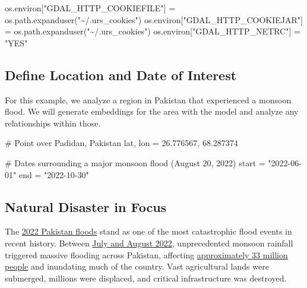 \documentclass[
  letterpaper,
  DIV=11,
  numbers=noendperiod]{scrreprt}
\newenvironment{Shaded}{\begin{snugshade}}{\end{snugshade}}
\newcommand{\CommentTok}[1]{\textcolor[rgb]{0.37,0.37,0.37}{#1}}
\newcommand{\FloatTok}[1]{\textcolor[rgb]{0.68,0.00,0.00}{#1}}
\newcommand{\NormalTok}[1]{\textcolor[rgb]{0.00,0.23,0.31}{#1}}
\newcommand{\OperatorTok}[1]{\textcolor[rgb]{0.37,0.37,0.37}{#1}}
\newcommand{\StringTok}[1]{\textcolor[rgb]{0.13,0.47,0.30}{#1}}
\begin{document}
\begin{Shaded}
\begin{Highlighting}[]
\NormalTok{os.environ[}\StringTok{"GDAL\_HTTP\_COOKIEFILE"}\NormalTok{] }\OperatorTok{=}\NormalTok{ os.path.expanduser(}\StringTok{"\textasciitilde{}/.urs\_cookies"}\NormalTok{)}
\NormalTok{os.environ[}\StringTok{"GDAL\_HTTP\_COOKIEJAR"}\NormalTok{] }\OperatorTok{=}\NormalTok{ os.path.expanduser(}\StringTok{"\textasciitilde{}/.urs\_cookies"}\NormalTok{)}
\NormalTok{os.environ[}\StringTok{"GDAL\_HTTP\_NETRC"}\NormalTok{] }\OperatorTok{=} \StringTok{"YES"}
\end{Highlighting}
\end{Shaded}

\subsection{Define Location and Date of
Interest}\label{define-location-and-date-of-interest}

For this example, we analyze a region in Pakistan that experienced a
monsoon flood. We will generate embeddings for the area with the model
and analyze any relationships within those.

\begin{Shaded}
\begin{Highlighting}[]
\CommentTok{\# Point over Padidan, Pakistan}
\NormalTok{lat, lon }\OperatorTok{=} \FloatTok{26.776567}\NormalTok{, }\FloatTok{68.287374}

\CommentTok{\# Dates surrounding a major monsoon flood (August 20, 2022)}
\NormalTok{start }\OperatorTok{=} \StringTok{"2022{-}06{-}01"}
\NormalTok{end }\OperatorTok{=} \StringTok{"2022{-}10{-}30"}
\end{Highlighting}
\end{Shaded}

\subsection{Natural Disaster in Focus}\label{natural-disaster-in-focus}

The
\href{https://floodlist.com/asia/pakistan-monsoon-floods-august-2022}{2022
Pakistan floods} stand as one of the most catastrophic flood events in
recent history. Between
\href{https://agupubs.onlinelibrary.wiley.com/doi/full/10.1029/2022EF003230}{July
and August 2022}, unprecedented monsoon rainfall triggered massive
flooding across Pakistan, affecting
\href{https://www.worldbank.org/en/news/press-release/2022/10/28/pakistan-flood-damages-and-economic-losses-over-usd-30-billion-and-reconstruction-needs-over-usd-16-billion-new-assessme}{approximately
33 million people} and inundating much of the country. Vast agricultural
lands were submerged, millions were displaced, and critical
infrastructure was destroyed.
\end{document}
